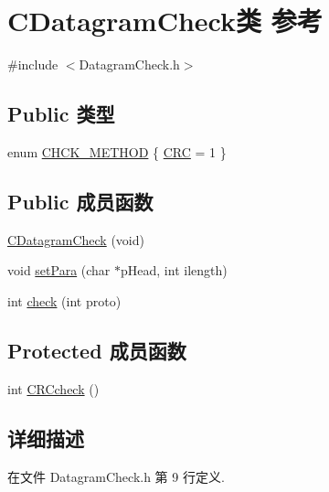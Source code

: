 \hypertarget{class_c_datagram_check}{}\section{C\+Datagram\+Check类 参考}
\label{class_c_datagram_check}


{\ttfamily \#include $<$Datagram\+Check.\+h$>$}

\subsection*{Public 类型}
\begin{DoxyCompactItemize}
\item 
enum \hyperlink{class_c_datagram_check_a291cad3176f8806883c6285957431b64}{C\+H\+C\+K\+\_\+\+M\+E\+T\+H\+OD} \{ \hyperlink{class_c_datagram_check_a291cad3176f8806883c6285957431b64a9074c0e21c72480135ede46aee3a9cc1}{C\+RC} = 1
 \}
\end{DoxyCompactItemize}
\subsection*{Public 成员函数}
\begin{DoxyCompactItemize}
\item 
\hyperlink{class_c_datagram_check_a28ea94b38dd758b30b470f42fc013025}{C\+Datagram\+Check} (void)
\item 
void \hyperlink{class_c_datagram_check_ac607f6742d36faec27f6462aefb6abaf}{set\+Para} (char $\ast$p\+Head, int ilength)
\item 
int \hyperlink{class_c_datagram_check_a9f21ffeb4696f31eb8af68b09cf17686}{check} (int proto)
\end{DoxyCompactItemize}
\subsection*{Protected 成员函数}
\begin{DoxyCompactItemize}
\item 
int \hyperlink{class_c_datagram_check_af7314fcfc87618386920fcb567f6f5d7}{C\+R\+Ccheck} ()
\end{DoxyCompactItemize}


\subsection{详细描述}


在文件 Datagram\+Check.\+h 第 9 行定义.



